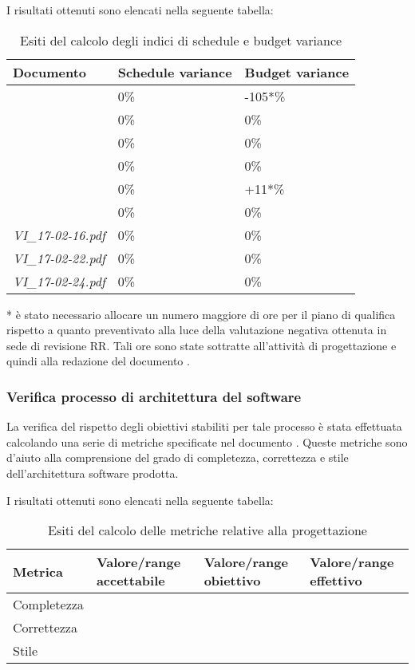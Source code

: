 		I risultati ottenuti sono elencati nella seguente tabella:	
		\begin{table}[H]
		\begin{tabular}{|l|l|l|}
		\hline
		\textbf{Documento} 		&\textbf{Schedule variance} &\textbf{Budget variance} 		\\
		\hline
		\PdQ 					&0\%		&-105*\%\\
		\NdP 					&0\%		&0\%\\
		\AdR 					&0\%		&0\%\\
		\PdP 					&0\%		&0\%\\
		\ST					&0\%		&+11*\%\\
		\Glossario 				&0\%		&0\%\\
		\textit{VI_17-02-16.pdf} 		&0\%		&0\%\\
		\textit{VI_17-02-22.pdf} 		&0\%		&0\%\\
		\textit{VI_17-02-24.pdf} 		&0\%		&0\%\\
		\hline
		\end{tabular}
		\caption{Esiti del calcolo degli indici di schedule e budget variance}
		\end{table}
		* è stato necessario allocare un numero maggiore di ore per il piano di qualifica rispetto a quanto preventivato alla luce della valutazione negativa ottenuta in sede di revisione RR. Tali ore sono state sottratte all'attività di progettazione e quindi alla redazione del documento \ST.
		
		\subsubsection{Verifica processo di architettura del software}
		La verifica del rispetto degli obiettivi stabiliti per tale processo è stata effettuata calcolando una serie di metriche specificate nel documento \NdP. Queste metriche sono d'aiuto alla comprensione del grado di completezza, correttezza e stile dell'architettura software prodotta.
		
		I risultati ottenuti sono elencati nella seguente tabella:
		\begin{table}[H]
		\begin{tabular}{|l|p{2.25cm}|p{2.25cm}|p{2.25cm}|}
		\hline
		\textbf{Metrica} 		 					&\textbf{Valore/range accettabile}	&\textbf{Valore/range obiettivo}	&\textbf{Valore/range effettivo}\\
		\hline
		Completezza									&								&							&\\



		\hline
		Correttezza 								&								&							&\\



		\hline
		Stile 										&								&							&\\



		\hline
		\end{tabular}
		\caption{Esiti del calcolo delle metriche relative alla progettazione}
		\end{table}
		
